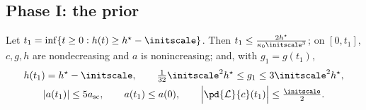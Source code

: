 \subsection{Phase I: the prior}

\begin{lemma}
\label{lem:J-prior}
Let $t_1=\inf\{t\ge0: h(t)\ge h^\star-\initscale\}$. Then $t_1\le\frac{2 h^\star}{\kappa_0\initscale^3}$; on $[0,t_1]$, $c,g, h$ are nondecreasing and $a$ is
nonincreasing; and, with $ g_1=g(t_1)$,
\begin{gather*}
  h(t_1)= h^\star-\initscale,\qquad \tfrac{1}{32}\initscale^2 h^\star\le g_1\le3\initscale^2 h^\star,\\
 |a(t_1)|\le5a_{\mathrm{sc}},\qquad a(t_1)\le a(0),\qquad \Bigl|\pd{\mathcal L}{c}(t_1)\Bigr|\le\tfrac{\initscale}{2} .
\end{gather*}
\end{lemma}

